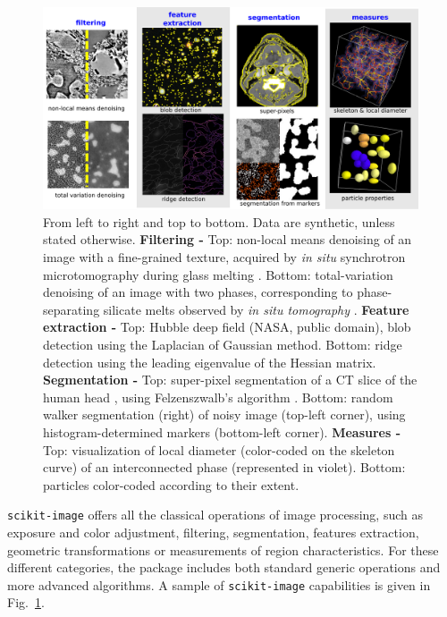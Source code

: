 \documentclass[twocolumn]{bmcart}%
\begin{document}
\begin{figure}
    \centerline{\includegraphics[width=0.99\textwidth]{tomo_gallery}}
    \caption{ From left to right and top to bottom.
	Data are synthetic, unless stated otherwise.
	\textbf{Filtering -} Top: non-local means denoising of an image
	with a fine-grained texture, acquired by \emph{in situ}
	synchrotron microtomography during
	glass melting \citep{Gouillart2012}. Bottom: total-variation
	denoising of an image with two phases, corresponding to
	phase-separating silicate melts observed by \emph{in situ
	tomography} \citep{Bouttes2015}.
	\textbf{Feature extraction -} Top: Hubble deep field (NASA,
	public domain), blob detection using the
	Laplacian of Gaussian method. Bottom: ridge detection using the
	leading eigenvalue of the Hessian matrix.
	\textbf{Segmentation - } Top: super-pixel segmentation
	of a CT slice of the human head \citep{tomo_wikipedia}, using
	Felzenszwalb's algorithm \citep{Felzenszwalb2004}. Bottom: random
	walker segmentation (right) of noisy image (top-left corner), using
	histogram-determined markers (bottom-left corner).
	\textbf{Measures -} Top: visualization of local diameter
	(color-coded on the skeleton curve) of an
	interconnected phase (represented in violet).  Bottom: particles color-coded according
	to their extent.
\label{fig:tomo_gallery}}
\end{figure}

\texttt{scikit-image} offers all the classical operations of image
processing, such as exposure and color adjustment, filtering,
segmentation, features extraction, geometric transformations or
measurements of region characteristics. For these
different categories, the package includes both standard generic
operations and more advanced algorithms. A sample of
\texttt{scikit-image} capabilities is given in
Fig.~\ref{fig:tomo_gallery}.  
\end{document}
